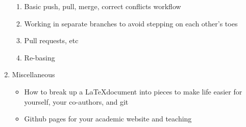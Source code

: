\documentclass[12pt,letterpaper]{article}
\begin{document}
\begin{enumerate}
\begin{enumerate}
			\item Basic push, pull, merge, correct conflicts workflow
			\item Working in separate branches to avoid stepping on each other's toes
			\item Pull requests, etc 
			\item Re-basing
		\end{enumerate}
	\item Miscellaneous
		\begin{itemize}
			\item How to break up a \LaTeX document into pieces to make life easier for yourself, your co-authors, and git
			\item Github pages for your academic website and teaching
		\end{itemize}
\end{enumerate}
	
\end{document}
